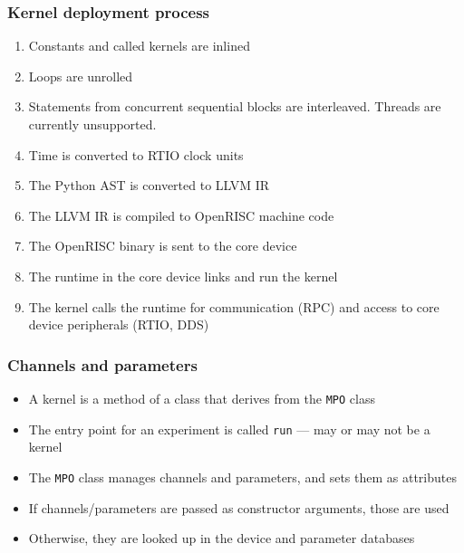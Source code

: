 \documentclass{beamer}
\begin{document}
\begin{frame}
\frametitle{\selectfont Kernel deployment process}
\begin{enumerate}
\item Constants and called kernels are inlined
\item Loops are unrolled
\item Statements from concurrent sequential blocks are interleaved. Threads are currently unsupported.
\item Time is converted to RTIO clock units
\item The Python AST is converted to LLVM IR
\item The LLVM IR is compiled to OpenRISC machine code
\item The OpenRISC binary is sent to the core device
\item The runtime in the core device links and run the kernel
\item The kernel calls the runtime for communication (RPC) and access to core device peripherals (RTIO, DDS)
\end{enumerate}
\end{frame}

\begin{frame}[fragile]
\frametitle{\selectfont Channels and parameters}
\begin{itemize}
\item A kernel is a method of a class that derives from the \verb!MPO! class
\item The entry point for an experiment is called \verb!run! --- may or may not be a kernel
\item The \verb!MPO! class manages channels and parameters, and sets them as attributes
\item If channels/parameters are passed as constructor arguments, those are used
\item Otherwise, they are looked up in the device and parameter databases
\end{itemize}
\end{frame}
\end{document}
